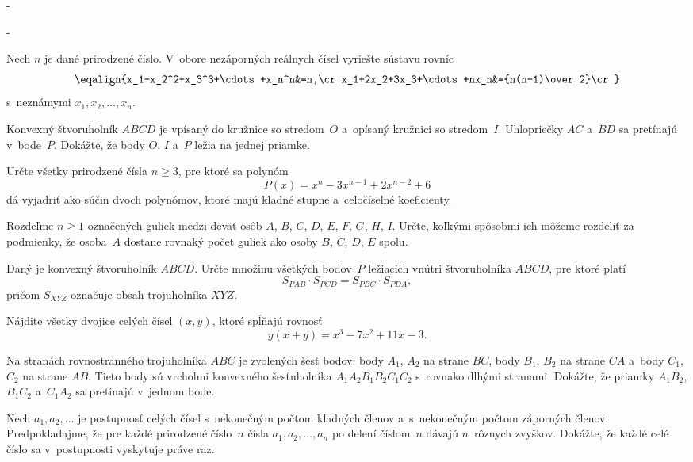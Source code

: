 {%
-}
\podpis{-:-}

{%
-}
\podpis{-:-}

{%
Nech $n$ je dané prirodzené číslo.
V~obore nezáporných reálnych čísel vyriešte sústavu rovníc
$$
\eqalign{x_1+x_2^2+x_3^3+\cdots+x_n^n&=n,\cr
x_1+2x_2+3x_3+\cdots+nx_n&={n(n+1)\over 2}\cr}
$$
s~neznámymi $x_1,x_2,\dots,x_n$.}

{%
Konvexný štvoruholník $ABCD$ je vpísaný do kružnice so stredom~$O$
a~opísaný kružnici so stredom~$I$.
Uhlopriečky $AC$ a~$BD$ sa pretínajú v~bode~$P$.
Dokážte, že body $O$, $I$ a~$P$ ležia na jednej priamke.}

{%
Určte všetky prirodzené čísla $n\geq 3$, pre ktoré sa
polynóm
$$P(x)=x^n-3x^{n-1}+2x^{n-2}+6$$
dá vyjadriť ako súčin dvoch polynómov, ktoré majú kladné stupne
a~celočíselné koeficienty.}

{%
Rozdeľme $n\geq1$ označených guliek medzi deväť osôb
$A$, $B$, $C$, $D$, $E$, $F$, $G$, $H$, $I$.
Určte, koľkými spôsobmi ich môžeme rozdeliť za podmienky,
že osoba~$A$ dostane rovnaký počet guliek ako osoby $B$, $C$, $D$, $E$ spolu.}

{%
Daný je konvexný štvoruholník $ABCD$.
Určte množinu všetkých bodov~$P$ ležiacich vnútri
štvoruholníka $ABCD$, pre ktoré platí
$$S_{PAB}\cdot S_{PCD}=S_{PBC}\cdot S_{PDA},$$
pričom $S_{XYZ}$ označuje obsah trojuholníka $XYZ$.}

{%
Nájdite všetky dvojice celých čísel $(x,y)$, ktoré spĺňajú rovnosť
$$y(x+y)=x^3-7x^2+11x-3.$$}

{%
Na stranách rovnostranného trojuholníka $ABC$ je zvolených šesť bodov: body $A_1$, $A_2$ na strane $BC$, body $B_1$, $B_2$ na strane $CA$ a~body $C_1$, $C_2$ na strane $AB$. Tieto body sú vrcholmi konvexného šesťuholníka $A_1A_2B_1B_2C_1C_2$ s~rovnako dlhými stranami. Dokážte, že priamky $A_1B_2$, $B_1C_2$ a~$C_1A_2$ sa pretínajú v~jednom bode.}

{%
Nech $a_1, a_2, \ldots$ je postupnosť celých čísel s~nekonečným počtom kladných členov a~s~nekonečným počtom záporných členov. Predpokladajme, že pre každé prirodzené číslo~$n$ čísla $a_1, a_2, \ldots, a_n$ po delení číslom~$n$ dávajú $n$~rôznych zvyškov. Dokážte, že každé celé číslo sa v~postupnosti vyskytuje práve raz.}

